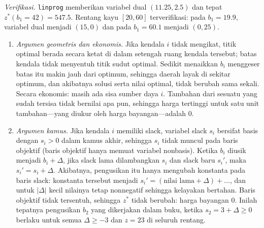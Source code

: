 \emph{Verifikasi.} \texttt{linprog} memberikan variabel dual $(11.25, 2.5)$ dan tepat $z^*(b_1 = 42) = 547.5$. Rentang kayu $[20, 60]$ terverifikasi: pada $b_1 = 19.9$, variabel dual menjadi $(15, 0)$ dan pada $b_1 = 60.1$ menjadi $(0, 25)$.


\begin{enumerate}
\item \emph{Argumen geometris dan ekonomis.} Jika kendala $i$ tidak mengikat, titik optimal berada secara ketat di dalam setengah ruang kendala tersebut; batas kendala tidak menyentuh titik sudut optimal. Sedikit menaikkan $b_i$ menggeser batas itu makin jauh dari optimum, sehingga daerah layak di sekitar optimum, dan akibatnya solusi serta nilai optimal, tidak berubah sama sekali. Secara ekonomis: masih ada sisa sumber daya $i$. Tambahan dari sesuatu yang sudah tersisa tidak bernilai apa pun, sehingga harga tertinggi untuk satu unit tambahan---yang diukur oleh harga bayangan---adalah $0$.
\item \emph{Argumen kamus.} Jika kendala $i$ memiliki slack, variabel slack $s_i$ bersifat basis dengan $s_i > 0$ dalam kamus akhir, sehingga $s_i$ tidak muncul pada baris objektif (baris objektif hanya memuat variabel nonbasis). Ketika $b_i$ diusik menjadi $b_i + \Delta$, jika slack lama dilambangkan $s_i$ dan slack baru $s_i'$, maka $s_i' = s_i + \Delta$. Akibatnya, pengusikan itu hanya mengubah konstanta pada baris slack: konstanta tersebut menjadi $s_i' = (\text{nilai lama} + \Delta) + \dots$, dan untuk $|\Delta|$ kecil nilainya tetap nonnegatif sehingga kelayakan bertahan. Baris objektif tidak tersentuh, sehingga $z^*$ tidak berubah: harga bayangan $0$. Inilah tepatnya pengusikan $b_2$ yang dikerjakan dalam buku, ketika $s_2 = 3 + \Delta \ge 0$ berlaku untuk semua $\Delta \ge -3$ dan $z = 23$ di seluruh rentang.
\end{enumerate}


